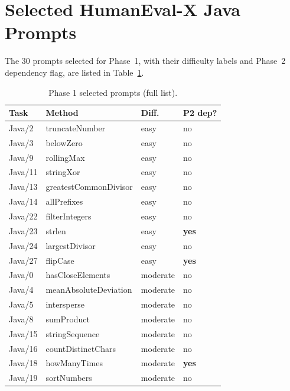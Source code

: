\documentclass[journal]{IEEEtran}
\begin{document}
\appendices
\section{Selected HumanEval-X Java Prompts}\label{app:prompts}

The 30 prompts selected for Phase~1, with their difficulty labels and
Phase~2 dependency flag, are listed in Table~\ref{tab:prompts-full}.

\begin{table}[!ht]
\renewcommand{\arraystretch}{1.05}
\caption{Phase 1 selected prompts (full list).}
\label{tab:prompts-full}
\centering
\footnotesize
\begin{tabular}{@{}llll@{}}
\toprule
\textbf{Task} & \textbf{Method} & \textbf{Diff.} & \textbf{P2 dep?} \\
\midrule
Java/2  & truncateNumber       & easy  & no \\
Java/3  & belowZero            & easy  & no \\
Java/9  & rollingMax           & easy  & no \\
Java/11 & stringXor            & easy  & no \\
Java/13 & greatestCommonDivisor& easy  & no \\
Java/14 & allPrefixes          & easy  & no \\
Java/22 & filterIntegers       & easy  & no \\
Java/23 & strlen               & easy  & \textbf{yes} \\
Java/24 & largestDivisor       & easy  & no \\
Java/27 & flipCase             & easy  & \textbf{yes} \\
\midrule
Java/0  & hasCloseElements     & moderate & no \\
Java/4  & meanAbsoluteDeviation& moderate & no \\
Java/5  & intersperse          & moderate & no \\
Java/8  & sumProduct           & moderate & no \\
Java/15 & stringSequence       & moderate & no \\
Java/16 & countDistinctChars   & moderate & no \\
Java/18 & howManyTimes         & moderate & \textbf{yes} \\
Java/19 & sortNumbers          & moderate & no \\

\end{tabular}
\end{table}
\end{document}
